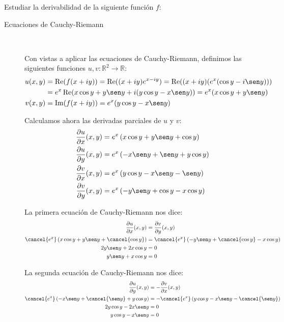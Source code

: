 \documentclass[12pt]{article}
\renewcommand{\Re}{\operatorname{Re}} %
\renewcommand{\Im}{\operatorname{Im}}
\begin{document}
    \begin{ejercicio}[3 puntos]
        Estudiar la derivabilidad de la siguiente función $f$:

        \begin{description}
            \item[Ecuaciones de Cauchy-Riemann]~
            
            Con vistas a aplicar las ecuaciones de Cauchy-Riemann, definimos las siguientes funciones $u,v:\mathbb{R}^2\to\mathbb{R}$:
        \begin{align*}
            u(x,y) &= \Re(f(x+iy)) = \Re((x+iy)e^{x-iy}) = \Re((x+iy)(e^x(\cos y - i\sen y)))\\
            &= e^x\Re(x\cos y +y\sen y + i(y\cos y - x\sen y)) = e^x(x\cos y +y\sen y)\\
            v(x,y) &= \Im(f(x+iy)) = e^x(y\cos y - x\sen y)
        \end{align*}

        Calculamos ahora las derivadas parciales de $u$ y $v$:
        \begin{align*}
            \frac{\partial u}{\partial x}(x,y) &= e^x\left(x\cos y + y\sen y+\cos y\right)\\
            \frac{\partial u}{\partial y}(x,y) &= e^x\left(-x\sen y + \sen y + y\cos y\right)\\
            \frac{\partial v}{\partial x}(x,y) &= e^x\left(y\cos y -x\sen y -\sen y\right)\\
            \frac{\partial v}{\partial y}(x,y) &= e^x\left(-y\sen y + \cos y - x\cos y\right)
        \end{align*}

        La primera ecuación de Cauchy-Riemann nos dice:
        \begin{align*}
            \frac{\partial u}{\partial x}(x,y) &= \frac{\partial v}{\partial y}(x,y)\\
            \cancel{e^x}\left(x\cos y + y\sen y+\cancel{\cos y}\right) &= \cancel{e^x}\left(-y\sen y + \cancel{\cos y} - x\cos y\right)\\
            2y\sen y + 2x\cos y &= 0\\
            y\sen y + x\cos y &= 0
        \end{align*}

        La segunda ecuación de Cauchy-Riemann nos dice:
        \begin{align*}
            \frac{\partial u}{\partial y}(x,y) &= -\frac{\partial v}{\partial x}(x,y)\\
            \cancel{e^x}\left(-x\sen y + \cancel{\sen y} + y\cos y\right) &= -\cancel{e^x}\left(y\cos y - x\sen y - \cancel{\sen y}\right)\\
            2y\cos y - 2x\sen y &= 0\\
            y\cos y - x\sen y &= 0
        \end{align*}


\end{description}
\end{ejercicio}
\end{document}
